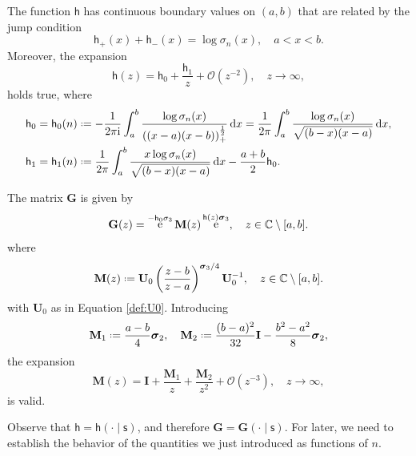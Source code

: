 \documentclass[reqno,a4paper,11pt]{amsart}
\DeclareMathOperator{\ee}{\rm e}
\newcommand{\C}{\mathbb{C}}
\newcommand{\Boh}{\mathcal{O}}
\newcommand{\ii}{\mathrm{i}}
\newcommand{\dd}{\mathrm{d}}
\newcommand*{\deff}{\mathrel{\vcenter{\baselineskip0.5ex \lineskiplimit0pt
                     \hbox{\scriptsize.}\hbox{\scriptsize.}}}%
                     =}
\renewcommand{\bm}{\mathbf}
\newcommand{\msf}{\mathsf}
\renewcommand{\sp}{\boldsymbol \sigma}
\newcommand{\sad}{\msf s}
\theoremstyle{definition}
\theoremstyle{remark}
\numberwithin{equation}{section}
\begin{document}
The function $\msf h$ has continuous boundary values on $(a,b)$ that are related by the jump condition
\[
    \msf h_+(x) + \msf h_-(x) =  \log \sigma_n(x), \quad a < x < b.
\]
%
Moreover, the expansion
%
\[ 
    \msf h(z) = \msf h_0 + \frac{\msf h_1}{z} + \Boh(z^{-2}), \quad z \to \infty,
\]
%
holds true, where
%
\[
    \begin{split}
        \msf h_0 = \msf h_0(n)
            &\deff - \frac{1}{2 \pi \ii} \int_a^b \frac{\log \sigma_n(x)}{((x-a)(x-b))_+^{\frac{1}{2}}} \, \dd x 
            = \frac{1}{2 \pi } \int_a^b \frac{\log \sigma_n(x)}{\sqrt{(b-x)(x-a)}} \, \dd x , \\
        \msf h_1 = \msf h_1(n) 
            &\deff  \frac{1}{2 \pi } \int_a^b \frac{x \log \sigma_n(x)}{\sqrt{(b-x)(x-a)}} \, \dd x - \frac{a+b}{2} \msf h_0.
    \end{split}
\]

The matrix $\bm G$ is given by
%
\begin{equation} \label{eq:global_G}
\bm G(z)=\ee^{- \msf h_0 \sigma_3} \bm M(z)\ee^{\msf h(z)\sp_3},\quad z\in \C\setminus [a,b].
\end{equation}
%
where\begin{equation} \label{eq:M}
\bm M(z)\deff \bm U_0\left( \frac{z-b}{z-a} \right)^{\sp_3/4}\bm U_0^{-1},\quad z\in \C\setminus [a,b].
%
\end{equation}
%
with $\bm U_0$ as in Equation \eqref{def:U0}. Introducing
%
\begin{equation}\label{deff:M1M2}
        \bm M_1 \deff 
        \frac{a-b}{4}\sp_2, \quad 
        \bm M_2 \deff  \frac{(b-a)^2}{32} \bm I - \frac{b^2-a^2}{8} \sp_2,
\end{equation}
%
the expansion
%
\begin{equation}\label{eq:asymptotics_M}
    \bm M(z) = \bm I + \frac{\bm M_1}{z} + \frac{\bm M_2}{z^2} + \Boh(z^{-3}), \quad z \to \infty,
\end{equation}
is valid.

Observe that $\msf h=\msf h(\cdot\mid \sad)$, and therefore $\bm G=\bm G(\cdot\mid \sad)$. For later, we need to establish the behavior of the quantities we just introduced as functions of $n$.
\end{document}
